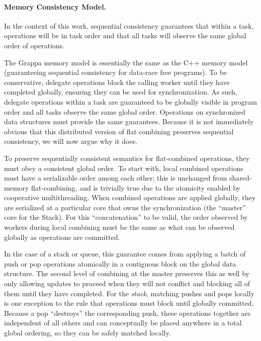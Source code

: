 \paragraph{Memory Consistency Model.}
\label{sec:memory-model}
In the context of this work, sequential consistency guarantees that within a
task, operations will be in task order and that all tasks will observe the
same global order of operations.

The Grappa memory model is essentially the same as the C++ memory
model~\cite{boehm:drf0,N2480,N2800} (guaranteeing sequential
consistency for data-race free programs). To be conservative, delegate
operations block the calling worker until they have completed globally,
ensuring they can be used for synchronization. As such, delegate operations
within a task are guaranteed to be globally visible in program order and all
tasks observe the same global order.
Operations on synchronized data structures must provide the same guarantees.
Because it is not immediately obvious
that this distributed version of flat combining preserves sequential
consistency, we will now argue why it does.

To preserve sequentially consistent semantics for flat-combined operations, they must obey a consistent global order.
To start with, local combined operations must have a serializable order among each other; this is unchanged from shared-memory flat-combining, and is trivially true due to the atomicity enabled by cooperative multithreading.
When combined operations are applied globally, they are serialized at a particular core that owns the synchronization (the ``master'' core for the Stack).
For this ``concatenation'' to be valid, the order observed by workers during local combining must be the same as what can be observed globally as operations are committed.

In the case of a stack or queue, this guarantee comes from applying a batch of push or pop operations atomically in a contiguous block on the global data structure. The second level of combining at the master preserves this as well by only allowing updates to proceed when they will not conflict and blocking all of them until they have completed.
For the \emph{stack}, matching pushes and pops locally is one exception to the rule that operations must block until globally committed. Because a pop ``destroys'' the corresponding push, these operations together are independent of all others and can conceptually be placed anywhere in a total global ordering, so they can be safely matched locally.

